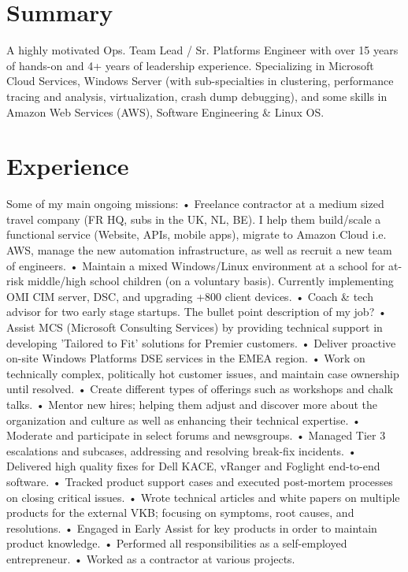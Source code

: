 \documentclass[11pt,a4paper,sans]{moderncv}
\begin{document}
\makecvtitle

\section{Summary}
{
  A highly motivated Ops. Team Lead / Sr. Platforms Engineer with 
  over 15 years of hands-on and 4+ years of leadership experience. 
  Specializing in Microsoft Cloud Services, Windows Server (with 
  sub-specialties in clustering, performance tracing and analysis,
  virtualization, crash dump debugging), and some skills in Amazon
  Web Services (AWS), Software Engineering & Linux OS.
}
\section{Experience}
{
  Some of my main ongoing missions:
• Freelance contractor at a medium sized travel company (FR HQ, subs in the UK, NL, BE). 
  I help them build/scale a functional service (Website, APIs, mobile apps), migrate to Amazon Cloud 
  i.e. AWS, manage the new automation infrastructure, as well as recruit a new team of engineers.
• Maintain a mixed Windows/Linux environment at a school for at-risk middle/high school children (on a voluntary basis). 
  Currently implementing OMI CIM server, DSC, and upgrading +800 client devices.
• Coach & tech advisor for two early stage startups.
}
{
  The bullet point description of my job?
• Assist MCS (Microsoft Consulting Services) by providing technical 
  support in developing 'Tailored to Fit' solutions for Premier 
  customers.
• Deliver proactive on-site Windows Platforms DSE services in the 
  EMEA region.
• Work on technically complex, politically hot customer issues, and maintain case ownership until resolved.
• Create different types of offerings such as workshops and chalk talks.
• Mentor new hires; helping them adjust and discover more about the organization and culture as well as enhancing their technical expertise.
• Moderate and participate in select forums and newsgroups.
}
{
• Managed Tier 3 escalations and subcases, addressing and resolving break-fix incidents.
• Delivered high quality fixes for Dell KACE, vRanger and Foglight end-to-end software.
}
{
• Tracked product support cases and executed post-mortem processes on closing critical issues.
• Wrote technical articles and white papers on multiple products for the external VKB; focusing on symptoms, root causes, and resolutions.
• Engaged in Early Assist for key products in order to maintain product knowledge.
}
{
• Performed all responsibilities as a self-employed entrepreneur.
• Worked as a contractor at various projects.
}
\end{document}
